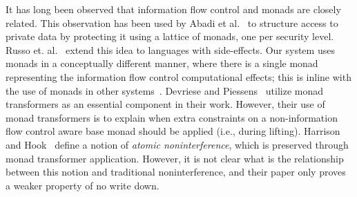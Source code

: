 \documentclass{sigplanconf}
\begin{document}
It has long been observed that information flow control and monads are
closely related.  This observation has been used by Abadi et
al.~\cite{abadi+:core} to structure access to private data by protecting
it using a lattice of monads, one per security level. Russo et. al.~\cite{Russo+:Haskell08} extend this 
idea to languages with side-effects. Our system uses
monads in a conceptually different manner, where there is a single monad
representing the information flow control computational effects; this
is inline with the use of monads in other systems~\cite{Harrison05,lio,Devriese:2011}.
Devriese and Piessens~\cite{Devriese:2011} utilize monad
transformers as an essential component in their work.  However, their use
of monad transformers is to explain when extra constraints on a non-information
flow control aware base monad should be applied (i.e., during lifting).
Harrison and Hook~\cite{Harrison05} define a notion of \emph{atomic noninterference},
which is preserved through monad transformer application.  However, it is not
clear what is the relationship between this notion and traditional noninterference,
and their paper only proves a weaker property of no write down.
\end{document}
